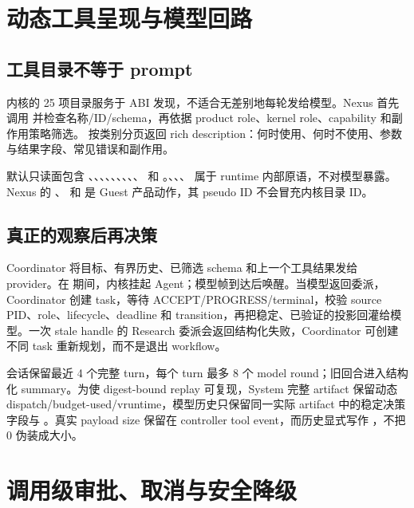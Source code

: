 \section{动态工具呈现与模型回路}

\subsection{工具目录不等于 prompt}

内核的 25 项目录服务于 ABI 发现，不适合无差别地每轮发给模型。Nexus 首先调用 并检查名称/ID/schema，再依据 product role、kernel role、capability 和副作用策略筛选。 按类别分页返回 rich description：何时使用、何时不使用、参数与结果字段、常见错误和副作用。

默认只读面包含 、、、、、、、、、 和 。、、、 属于 runtime 内部原语，不对模型暴露。Nexus 的 、 和  是 Guest 产品动作，其 pseudo ID 不会冒充内核目录 ID。

\subsection{真正的观察后再决策}

Coordinator 将目标、有界历史、已筛选 schema 和上一个工具结果发给 provider。在  期间，内核挂起 Agent；模型帧到达后唤醒。当模型返回委派，Coordinator 创建 task，等待 ACCEPT/PROGRESS/terminal，校验 source PID、role、lifecycle、deadline 和 transition，再把稳定、已验证的投影回灌给模型。一次 stale handle 的 Research 委派会返回结构化失败，Coordinator 可创建不同 task 重新规划，而不是退出 workflow。

会话保留最近 4 个完整 turn，每个 turn 最多 8 个 model round；旧回合进入结构化 summary。为使 digest-bound replay 可复现，System 完整 artifact 保留动态 dispatch/budget-used/vruntime，模型历史只保留同一实际 artifact 中的稳定决策字段与 。真实 payload size 保留在 controller tool event，而历史显式写作 ，不把 0 伪装成大小。

\section{调用级审批、取消与安全降级}


